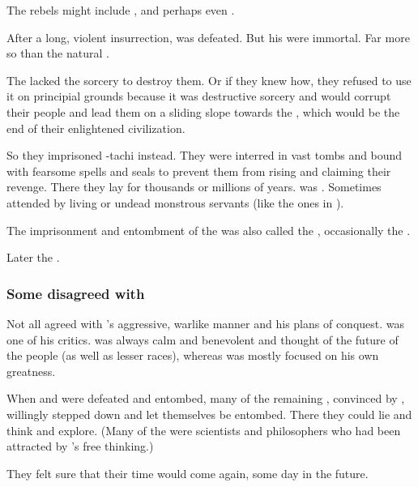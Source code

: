 The rebels might include \Iurzmacul, \Nexagglachel and perhaps even \Ishnaruchaefir. 

After a long, violent insurrection, \Sethicus was defeated.
But his \dragons were immortal.
Far more so than the natural \ophidians.

The \ophidians lacked the sorcery to destroy them. 
Or if they knew how, they refused to use it on principial grounds because it was destructive sorcery and would corrupt their people and lead them on a sliding slope towards the \xs, which would be the end of their enlightened civilization.

So they imprisoned \Sethicus-tachi instead.
They were interred in vast tombs and bound with fearsome spells and seals to prevent them from rising and claiming their revenge.
There they lay for thousands or millions of years.
\Nexagglachel was . 
Sometimes attended by living or undead monstrous servants (like the ones in \Nithdornazsh).

The imprisonment and entombment of the \dragons was also called the , occasionally the .

Later the \dragons {}. 





\subsubsection{Some \dragons disagreed with \Sethicus}
Not all \dragons agreed with \Sethicus's aggressive, warlike manner and his plans of conquest. 
\Nexagglachel was one of his critics.
\Nexagglachel was always calm and benevolent and thought of the future of the people (\ophidians as well as lesser races), whereas \Sethicus was mostly focused on his own greatness. 

When \Sethicus and \Tiamat were defeated and entombed, many of the remaining \dragons, convinced by \Nexagglachel, willingly stepped down and let themselves be entombed.
There they could lie and think and explore. 
(Many of the \dragons were scientists and philosophers who had been attracted by \Sethicus's free thinking.)

They felt sure that their time would come again, some day in the future. 









